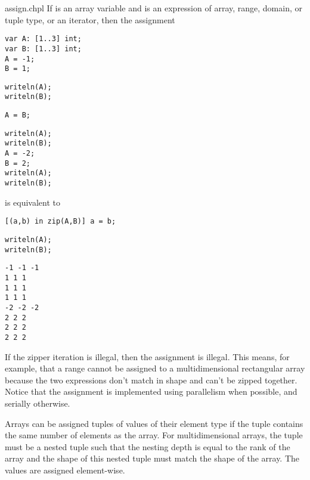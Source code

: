 \begin{chapelexample}{assign.chpl}
If  is an array variable and  is an expression
of array, range, domain, or tuple type, or an iterator, then the
assignment
\begin{chapelpre}
\begin{verbatim}
var A: [1..3] int;
var B: [1..3] int;
A = -1;
B = 1;
\end{verbatim}
\end{chapelpre}
\begin{chapelnoprint}
\begin{verbatim}
writeln(A);
writeln(B);
\end{verbatim}
\end{chapelnoprint}
\begin{chapel}
\begin{verbatim}
A = B;
\end{verbatim}
\end{chapel}
\begin{chapelnoprint}
\begin{verbatim}
writeln(A);
writeln(B);
A = -2;
B = 2;
writeln(A);
writeln(B);
\end{verbatim}
\end{chapelnoprint}
is equivalent to
\begin{chapel}
\begin{verbatim}
[(a,b) in zip(A,B)] a = b;
\end{verbatim}
\end{chapel}
\begin{chapelpost}
\begin{verbatim}
writeln(A);
writeln(B);
\end{verbatim}
\end{chapelpost}
\begin{chapeloutput}
\begin{verbatim}
-1 -1 -1
1 1 1
1 1 1
1 1 1
-2 -2 -2
2 2 2
2 2 2
2 2 2
\end{verbatim}
\end{chapeloutput}
If the zipper iteration is illegal, then the assignment is illegal.
This means, for example, that a range cannot be assigned to a
multidimensional rectangular array because the two expressions don't
match in shape and can't be zipped together.  Notice that the
assignment is implemented using parallelism when possible, and
serially otherwise.
\end{chapelexample}

Arrays can be assigned tuples of values of their element type if the
tuple contains the same number of elements as the array.  For
multidimensional arrays, the tuple must be a nested tuple such that
the nesting depth is equal to the rank of the array and the shape of
this nested tuple must match the shape of the array.  The values are
assigned element-wise.

